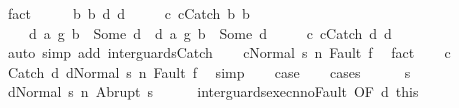 \begin{isabellebody}
\ fact\isanewline
\ \ \isamarkupfalse%
\ \isamarkupfalse%
\ b{}\ b{}\ d{}\ d{}\ \isanewline
\ \ \ \ c{}{\isacharcolon}\ {\isachardoublequoteopen}c{}{\isacharequal}Catch\ b{}\ b{}{\isachardoublequoteclose}\ \ \isanewline
\ \ \ \ d{}{\isacharcolon}\ {\isachardoublequoteopen}{\isacharparenleft}a{}\ {\isasyminter}\isactrlsub g\ b{}{\isacharparenright}\ {\isacharequal}\ Some\ d{}{\isachardoublequoteclose}\ \ d{}{\isacharcolon}\ {\isachardoublequoteopen}{\isacharparenleft}a{}\ {\isasyminter}\isactrlsub g\ b{}{\isacharparenright}\ {\isacharequal}\ Some\ d{}{\isachardoublequoteclose}\ \isanewline
\ \ \ \ c{\isacharcolon}\ {\isachardoublequoteopen}c{\isacharequal}Catch\ d{}\ d{}{\isachardoublequoteclose}\isanewline
\ \ \ \ \isamarkupfalse%
\ {\isacharparenleft}auto\ simp\ add{\isacharcolon}\ inter{\isacharunderscore}guards{\isacharunderscore}Catch{\isacharparenright}\isanewline
\ \ \isamarkupfalse%
\ {\isachardoublequoteopen}{\isasymGamma}{\isasymturnstile}{\isasymlangle}c{\isacharcomma}Normal\ s{\isasymrangle}\ {\isacharequal}n{\isasymRightarrow}\ Fault\ f{\isachardoublequoteclose}\ \isamarkupfalse%
\ fact\isanewline
\ \ \isamarkupfalse%
\ c\ \isamarkupfalse%
\ {\isachardoublequoteopen}{\isasymGamma}{\isasymturnstile}{\isasymlangle}Catch\ d{}\ d{}{\isacharcomma}Normal\ s{\isasymrangle}\ {\isacharequal}n{\isasymRightarrow}\ Fault\ f{\isachardoublequoteclose}\ \isamarkupfalse%
\ simp\isanewline
\ \ \isamarkupfalse%
\ {\isacharquery}case\isanewline
\ \ \isamarkupfalse%
\ {\isacharparenleft}cases{\isacharparenright}\isanewline
\ \ \ \ \isamarkupfalse%
\ s{\isacharprime}\isanewline
\ \ \ \ \isamarkupfalse%
\ {\isachardoublequoteopen}{\isasymGamma}{\isasymturnstile}{\isasymlangle}d{}{\isacharcomma}Normal\ s{\isasymrangle}\ {\isacharequal}n{\isasymRightarrow}\ Abrupt\ s{\isacharprime}{\isachardoublequoteclose}\isanewline
\ \ \ \ \isamarkupfalse%
\ inter{\isacharunderscore}guards{\isacharunderscore}execn{\isacharunderscore}noFault\ {\isacharbrackleft}OF\ d{}\ this{\isacharbrackright}\ \isamarkupfalse%
\isanewline

\end{isabellebody}
